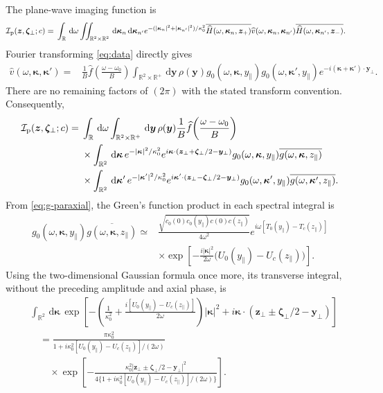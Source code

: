 \documentclass[11pt]{article}
\newcommand{\R}{\mathbb{R}}
\newcommand{\by}{\bm{y}}
\newcommand{\bz}{\bm{z}}
\newcommand{\bzeta}{\boldsymbol{\zeta}}
\newcommand{\bkappa}{\boldsymbol{\kappa}}
\newcommand{\dd}{\,\mathrm{d}}
\begin{document}
The plane-wave imaging function is
\begin{align}
\mathcal I_{\rm p}(\bz,\bzeta_\perp;c)
={}&\int_\R\dd\omega
\iint_{\R^2\times\R^2}\dd\bkappa_n\dd\bkappa_{n'}
e^{-(|\bkappa_n|^2+|\bkappa_{n'}|^2)/\kappa_0^2}
\overline{\widehat H(\omega,\bkappa_n,\bz_+)}
\widehat v(\omega,\bkappa_n,\bkappa_{n'})
\overline{\widehat H(\omega,\bkappa_{n'},\bz_-)}.
\end{align}
Fourier transforming \eqref{eq:data} directly gives
\begin{align}
\widehat v(\omega,\bkappa,\bkappa')
={}&\frac{1}{B}\widehat f\!\left(\frac{\omega-\omega_0}{B}\right)
\int_{\R^2\times\R^+}\dd\by\,\rho(\by)
g_0(\omega,\bkappa,y_\parallel)
g_0(\omega,\bkappa',y_\parallel)
e^{-i(\bkappa+\bkappa')\cdot\by_\perp}.
\end{align}
There are no remaining factors of $(2\pi)$ with the stated transform
convention. Consequently,
\begin{align}
\mathcal I_{\rm p}(\bz,\bzeta_\perp;c)
={}&\int_\R\dd\omega\int_{\R^2\times\R^+}\dd\by\,
\rho(\by)\frac{1}{B}\widehat f\!\left(\frac{\omega-\omega_0}{B}\right)
\nonumber\\
&\times\int_{\R^2}\dd\bkappa\,
e^{-|\bkappa|^2/\kappa_0^2}
e^{i\bkappa\cdot(\bz_\perp+\bzeta_\perp/2-\by_\perp)}
g_0(\omega,\bkappa,y_\parallel)
\overline{g(\omega,\bkappa,z_\parallel)}
\nonumber\\
&\times\int_{\R^2}\dd\bkappa'\,
e^{-|\bkappa'|^2/\kappa_0^2}
e^{i\bkappa'\cdot(\bz_\perp-\bzeta_\perp/2-\by_\perp)}
g_0(\omega,\bkappa',y_\parallel)
\overline{g(\omega,\bkappa',z_\parallel)}.
\label{eq:Ip-exact-spectral}
\end{align}
From \eqref{eq:g-paraxial}, the Green's function product in each
spectral integral is
\begin{align}
g_0(\omega,\bkappa,y_\parallel)
\overline{g(\omega,\bkappa,z_\parallel)}
\simeq{}&\frac{\sqrt{c_0(0)c_0(y_\parallel)c(0)c(z_\parallel)}}{4\omega^2}
e^{i\omega[T_0(y_\parallel)-T_c(z_\parallel)]}
\nonumber\\
&\times\exp\!\left[-\frac{i|\bkappa|^2}{2\omega}
\big(U_0(y_\parallel)-U_c(z_\parallel)\big)\right].
\end{align}
Using the two-dimensional Gaussian formula once more, its transverse
integral, without the preceding amplitude and axial phase, is
\begin{align}
&\int_{\R^2}\dd\bkappa\,
\exp\!\left[-\left(\frac{1}{\kappa_0^2}
+\frac{i[U_0(y_\parallel)-U_c(z_\parallel)]}{2\omega}\right)|\bkappa|^2
+i\bkappa\cdot(\bz_\perp\pm\bzeta_\perp/2-\by_\perp)\right]
\nonumber\\
&\quad=\frac{\pi\kappa_0^2}
{1+i\kappa_0^2[U_0(y_\parallel)-U_c(z_\parallel)]/(2\omega)}
\nonumber\\
&\qquad\times\exp\!\left[-\frac{\kappa_0^2
|\bz_\perp\pm\bzeta_\perp/2-\by_\perp|^2}
{4\{1+i\kappa_0^2[U_0(y_\parallel)-U_c(z_\parallel)]/(2\omega)\}}\right].
\label{eq:plane-gaussian}
\end{align}
\end{document}
